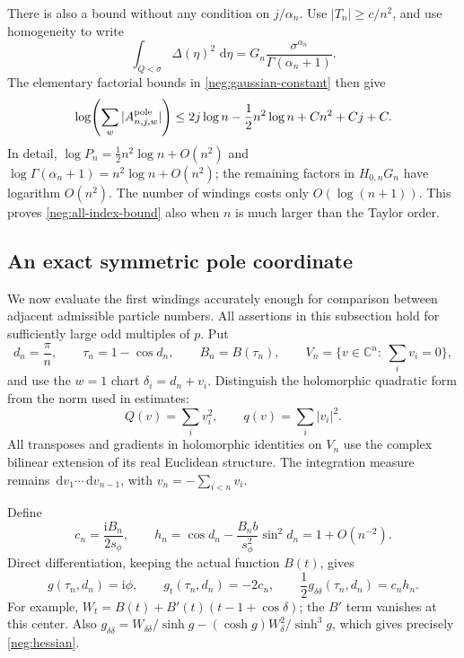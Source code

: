 \documentclass[11pt]{article}
\numberwithin{equation}{section}
\theoremstyle{definition}
\newcommand{\C}{\mathbb C}
\newcommand{\ii}{\mathrm i}
\newcommand{\dd}{\,\mathrm d}
\begin{document}
There is also a bound without any condition on \(j/\alpha_n\).
Use \(|T_n|\ge c/n^2\), and use homogeneity to write
\[
 \int_{Q<\sigma}\Delta(\eta)^2\,\dd\eta
       =G_n\frac{\sigma^{\alpha_n}}{\Gamma(\alpha_n+1)}.
 \]
The elementary factorial bounds in \eqref{neg:gaussian-constant}
then give
\begin{equation}
 \log\!\left(\sum_w|A^{\rm pole}_{n,j,w}|\right)
 \le 2j\log n-\frac12n^2\log n+Cn^2+Cj+C .
 \label{neg:all-index-bound}
\end{equation}
In detail,
\(\log P_n=\tfrac12n^2\log n+O(n^2)\) and
\(\log\Gamma(\alpha_n+1)=n^2\log n+O(n^2)\);
the remaining factors in \(H_{0,n}G_n\) have logarithm \(O(n^2)\).
The number of windings costs only \(O(\log(n+1))\).
This proves \eqref{neg:all-index-bound} also when \(n\) is much
larger than the Taylor order.

\subsection{An exact symmetric pole coordinate}
\label{neg:normal-form}

We now evaluate the first windings accurately enough for comparison
between adjacent admissible particle numbers.  All assertions in
this subsection hold for sufficiently large odd multiples of \(p\).
Put
\begin{equation}
 d_n=\frac\pi n,\qquad
 \tau_n=1-\cos d_n,\qquad B_n=B(\tau_n),\qquad
 V_n=\{v\in\C^n:\ \sum_i v_i=0\},
 \label{neg:center}
\end{equation}
and use the \(w=1\) chart \(\delta_i=d_n+v_i\).  Distinguish the
holomorphic quadratic form from the norm used in estimates:
\[
 Q(v)=\sum_i v_i^2,\qquad q(v)=\sum_i|v_i|^2 .
 \]
All transposes and gradients in holomorphic identities on \(V_n\)
use the complex bilinear extension of its real Euclidean structure.
The integration measure remains
\(\dd v_1\cdots\dd v_{n-1}\), with \(v_n=-\sum_{i<n}v_i\).

Define
\begin{equation}
 c_n=\frac{\ii B_n}{2s_\phi},\qquad
 h_n=\cos d_n-\frac{B_n b}{s_\phi^2}\sin^2d_n
       =1+O(n^{-2}).
 \label{neg:hessian}
\end{equation}
Direct differentiation, keeping the actual function \(B(t)\), gives
\begin{equation}
 g(\tau_n,d_n)=\ii\phi,\qquad
 g_t(\tau_n,d_n)=-2c_n,\qquad
 \frac12g_{\delta\delta}(\tau_n,d_n)=c_n h_n .
 \label{neg:center-derivatives}
\end{equation}
For example, \(W_t=B(t)+B'(t)(t-1+\cos\delta)\); the
\(B'\) term vanishes at this center.  Also
\(g_{\delta\delta}=W_{\delta\delta}/\sinh g
-(\cosh g)W_\delta^2/\sinh^3g\), which gives precisely
\eqref{neg:hessian}.
\end{document}
